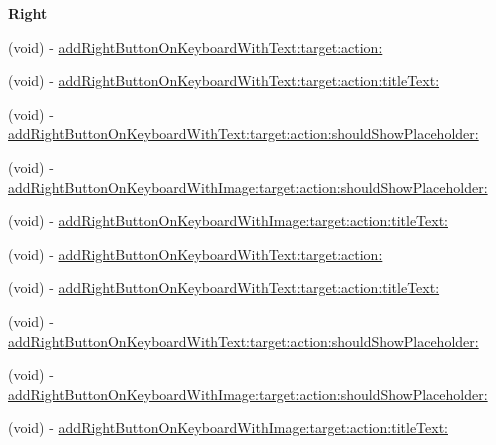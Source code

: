 \begin{Indent}\textbf{ Right}\par
{\em 

 

 }\begin{DoxyCompactItemize}
\item 
(void) -\/ \mbox{\hyperlink{category_u_i_view_07_i_q_toolbar_addition_08_ab83547e299c6a19d134fb5216f6beb56}{add\+Right\+Button\+On\+Keyboard\+With\+Text\+:target\+:action\+:}}
\item 
(void) -\/ \mbox{\hyperlink{category_u_i_view_07_i_q_toolbar_addition_08_a1f209b6022027c57fbe73ca022a1f055}{add\+Right\+Button\+On\+Keyboard\+With\+Text\+:target\+:action\+:title\+Text\+:}}
\item 
(void) -\/ \mbox{\hyperlink{category_u_i_view_07_i_q_toolbar_addition_08_afd84585c96476e8afc4bce77036605bf}{add\+Right\+Button\+On\+Keyboard\+With\+Text\+:target\+:action\+:should\+Show\+Placeholder\+:}}
\item 
(void) -\/ \mbox{\hyperlink{category_u_i_view_07_i_q_toolbar_addition_08_a8620eaa9f3ac76db2a7f980f631b52a9}{add\+Right\+Button\+On\+Keyboard\+With\+Image\+:target\+:action\+:should\+Show\+Placeholder\+:}}
\item 
(void) -\/ \mbox{\hyperlink{category_u_i_view_07_i_q_toolbar_addition_08_a0424bd7ee3e322412b996ed63fe6e435}{add\+Right\+Button\+On\+Keyboard\+With\+Image\+:target\+:action\+:title\+Text\+:}}
\item 
(void) -\/ \mbox{\hyperlink{category_u_i_view_07_i_q_toolbar_addition_08_ab83547e299c6a19d134fb5216f6beb56}{add\+Right\+Button\+On\+Keyboard\+With\+Text\+:target\+:action\+:}}
\item 
(void) -\/ \mbox{\hyperlink{category_u_i_view_07_i_q_toolbar_addition_08_a1f209b6022027c57fbe73ca022a1f055}{add\+Right\+Button\+On\+Keyboard\+With\+Text\+:target\+:action\+:title\+Text\+:}}
\item 
(void) -\/ \mbox{\hyperlink{category_u_i_view_07_i_q_toolbar_addition_08_afd84585c96476e8afc4bce77036605bf}{add\+Right\+Button\+On\+Keyboard\+With\+Text\+:target\+:action\+:should\+Show\+Placeholder\+:}}
\item 
(void) -\/ \mbox{\hyperlink{category_u_i_view_07_i_q_toolbar_addition_08_a8620eaa9f3ac76db2a7f980f631b52a9}{add\+Right\+Button\+On\+Keyboard\+With\+Image\+:target\+:action\+:should\+Show\+Placeholder\+:}}
\item 
(void) -\/ \mbox{\hyperlink{category_u_i_view_07_i_q_toolbar_addition_08_a0424bd7ee3e322412b996ed63fe6e435}{add\+Right\+Button\+On\+Keyboard\+With\+Image\+:target\+:action\+:title\+Text\+:}}

\end{DoxyCompactItemize}
\end{Indent}
